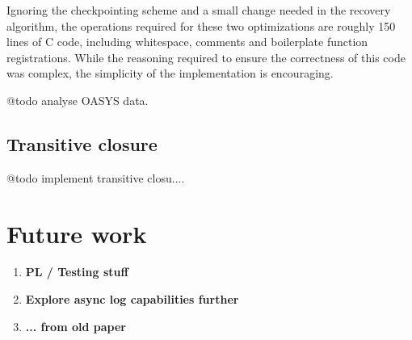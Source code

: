 \documentclass[letterpaper,twocolumn,english]{article}
\begin{document}
Ignoring the checkpointing scheme and a small change needed in the
recovery algorithm, the operations required for these two
optimizations are roughly 150 lines of C code, including whitespace,
comments and boilerplate function registrations.  While the reasoning
required to ensure the correctness of this code was complex, the
simplicity of the implementation is encouraging.

@todo analyse OASYS data.

\subsection{Transitive closure}

@todo implement transitive closu....

%
%
%
%    
% 
%
%
%
%
%
%    
%
%

\section{Future work}
\begin{enumerate}
  \item {\bf PL / Testing stuff}
  \item {\bf Explore async log capabilities further}
  \item {\bf ... from old paper}
\end{enumerate}
\end{document}
